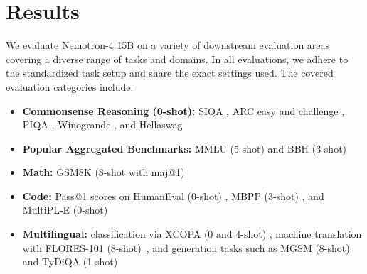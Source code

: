 \documentclass[11pt]{article}
\newcommand{\ours}{Nemotron-4}
\begin{document}
\section{Results}\label{results}
We evaluate \ours{} 15B on a variety of downstream evaluation areas covering a diverse range of tasks and domains. In all evaluations, we adhere to the standardized task setup and share the exact settings used. The covered evaluation categories include: 

\begin{itemize}
    \item \textbf{Commonsense Reasoning (0-shot):}  SIQA \citep{sap2019socialiqa}, ARC easy and challenge \citep{clark2018think},  PIQA \citep{Bisk2020PIQARA}, Winogrande \citep{Sakaguchi2020WINOGRANDEAA}, and Hellaswag  \citep{Zellers2019HellaSwagCA}
    \item \textbf{Popular Aggregated Benchmarks:} MMLU (5-shot) \citep{hendrycks2020measuring} and BBH (3-shot) \citep{suzgun2022challenging}
    \item \textbf{Math:} GSM8K (8-shot with maj@1) \citep{cobbe2021}
    \item \textbf{Code:} Pass@1 scores on HumanEval (0-shot) \citep{chen2021evaluating}, MBPP (3-shot) \citep{austin2021program}, and MultiPL-E (0-shot) \citep{multiple2023}
    \item \textbf{Multilingual:} classification via XCOPA (0 and 4-shot) \citep{xcopa}, machine translation with FLORES-101 (8-shot)~\citep{goyal2021}, and generation tasks such as MGSM (8-shot)~\citep{shi2022language} and TyDiQA (1-shot)~\citep{tydiqa} 
\end{itemize}





\end{document}
